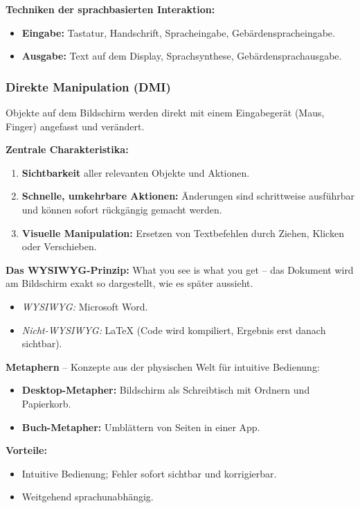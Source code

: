 \documentclass[12pt, a4paper]{article}
\begin{document}
\textbf{Techniken der sprachbasierten Interaktion:}
\begin{itemize}
  \item \textbf{Eingabe:} Tastatur, Handschrift, Spracheingabe, Gebärdenspracheingabe.
  \item \textbf{Ausgabe:} Text auf dem Display, Sprachsynthese, Gebärdensprachausgabe.
\end{itemize}

\subsubsection{Direkte Manipulation (DMI)}

Objekte auf dem Bildschirm werden direkt mit einem Eingabegerät (Maus, Finger)
angefasst und verändert.

\textbf{Zentrale Charakteristika:}
\begin{enumerate}
  \item \textbf{Sichtbarkeit} aller relevanten Objekte und Aktionen.
  \item \textbf{Schnelle, umkehrbare Aktionen:} Änderungen sind schrittweise
        ausführbar und können sofort rückgängig gemacht werden.
  \item \textbf{Visuelle Manipulation:} Ersetzen von Textbefehlen durch Ziehen,
        Klicken oder Verschieben.
\end{enumerate}

\textbf{Das WYSIWYG-Prinzip:} \glqq{}What you see is what you get\grqq{} --
das Dokument wird am Bildschirm exakt so dargestellt, wie es später aussieht.
\begin{itemize}
  \item \textit{WYSIWYG:} Microsoft Word.
  \item \textit{Nicht-WYSIWYG:} \LaTeX{} (Code wird kompiliert, Ergebnis erst danach
        sichtbar).
\end{itemize}

\textbf{Metaphern} -- Konzepte aus der physischen Welt für intuitive Bedienung:
\begin{itemize}
  \item \textbf{Desktop-Metapher:} Bildschirm als Schreibtisch mit Ordnern und
        Papierkorb.
  \item \textbf{Buch-Metapher:} Umblättern von Seiten in einer App.
\end{itemize}

\textbf{Vorteile:}
\begin{itemize}
  \item Intuitive Bedienung; Fehler sofort sichtbar und korrigierbar.
  \item Weitgehend sprachunabhängig.
\end{itemize}
\end{document}

